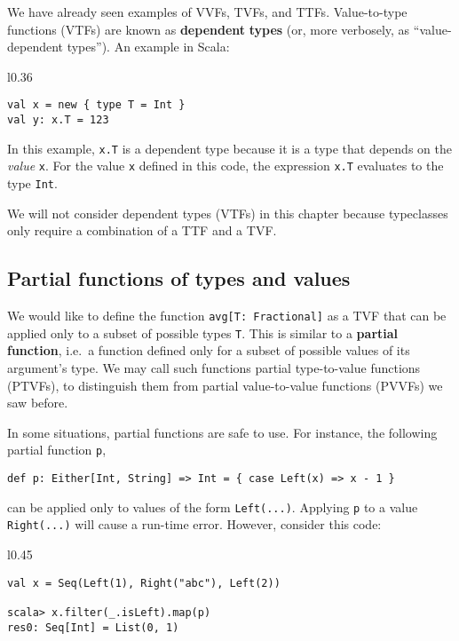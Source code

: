 We have already seen examples of VVFs, TVFs, and TTFs. Value-to-type
functions (VTFs) are known as \textbf{dependent} \textbf{types}
(or, more verbosely, as ``value-dependent types''). An example in
Scala:

\begin{wrapfigure}{l}{0.36\columnwidth}%
\vspace{-0.75\baselineskip}
\begin{lstlisting}
val x = new { type T = Int }
val y: x.T = 123
\end{lstlisting}

\vspace{-0.75\baselineskip}
\end{wrapfigure}%

\noindent In this example, \lstinline!x.T! is a dependent type because
it is a type that depends on the \emph{value} \lstinline!x!. For
the value \lstinline!x! defined in this code, the expression \lstinline!x.T!
evaluates to the type \lstinline!Int!. 

We will not consider dependent types (VTFs) in this chapter because
typeclasses only require a combination of a TTF and a TVF.

\subsection{Partial functions of types and values}

We would like to define the function \lstinline!avg[T: Fractional]!
as a TVF that can be applied only to a subset of possible types \lstinline!T!.
This is similar to a \textbf{partial function},
i.e.~a function defined only for a subset of possible values of its
argument's type. We may call such functions partial type-to-value
functions (PTVFs), to distinguish
them from partial value-to-value functions (PVVFs) we saw before.

In some situations, partial functions are safe to use. For instance,
the following partial function \lstinline!p!, 
\begin{lstlisting}
def p: Either[Int, String] => Int = { case Left(x) => x - 1 }
\end{lstlisting}
can be applied only to values of the form \lstinline!Left(...)!.
Applying \lstinline!p! to a value \lstinline!Right(...)! will cause
a run-time error. However, consider this code:

\begin{wrapfigure}{l}{0.45\columnwidth}%
\vspace{-1\baselineskip}
\begin{lstlisting}
val x = Seq(Left(1), Right("abc"), Left(2))

scala> x.filter(_.isLeft).map(p)
res0: Seq[Int] = List(0, 1)
\end{lstlisting}

\vspace{-1\baselineskip}
\end{wrapfigure}%

